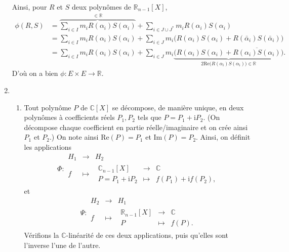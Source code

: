 \documentclass{../../td}
\begin{document}
\begin{enumerate}
      Ainsi, pour $R$ et $S$ deux polynômes de $\mathds{R}_{n-1}[X]$,
      \begin{align*}
        \phi(R, S) &= \overbrace{\sum_{i \in I} m_i R(\alpha_i) S(\alpha_i)}^{\in \mathds{R}} + \sum_{i \in J \cup J^*} m_i R(\alpha_i) S(\alpha_i) \\
        &= \sum_{i \in I} m_i R(\alpha_i) S(\alpha_i) + \sum_{i \in J} m_i\big(R(\alpha_i) S(\alpha_i) + R(\bar{\alpha}_i) S(\bar{\alpha}_i)\big) \\
        &= \sum_{i \in I} m_i R(\alpha_i) S(\alpha_i) + \sum_{i \in J} m_i\underbrace{\big(R(\alpha_i) S(\alpha_i) + \overline{R(\alpha_i)S(\alpha_i)}\big)}_{2 \mathrm{Re}\big(R(\alpha_i)S(\alpha_i)\big) \in \mathds{R}}
      .\end{align*}
      D'où on a bien $\phi : E \times E \to \mathds{R}$.
    \item
      \begin{enumerate}
        \item Tout polynôme $P$ de $\mathds{C}[X]$ se décompose, de manière unique, en deux polynômes à coefficients réels $P_1, P_2$ tels que $P = P_1 + \mathrm{i} P_2$.
          (On décompose chaque coefficient en partie réelle/imaginaire et on crée ainsi $P_1$ et $P_2$.)
          On note ainsi $\mathrm{Re}(P) = P_1$ et $\mathrm{Im}(P) = P_2$.
          Ainsi, on définit les applications
          \[
          \Phi :\begin{array}{|rcl}
            H_1 & \longrightarrow& H_2\\
            f & \longmapsto &
            \begin{array}{|rcl}
              \mathds{C}_{n-1}[X] & \to & \mathds{C}\\
              P = P_1 + \mathrm{i} P_2 & \mapsto & f(P_1) + \mathrm{i} f(P_2),
            \end{array}
          \end{array}
          \] 
          et \[
          \Psi : \begin{array}{|rcl}
            H_2 & \longrightarrow& H_1\\
            f & \longmapsto &
            \begin{array}{|rcl}
              \mathds{R}_{n-1}[X] & \to & \mathds{C}\\
              P & \mapsto & f(P).
            \end{array}
          \end{array}
          \] 
          Vérifions la $\mathds{C}$-linéarité de ces deux applications, puis qu'elles sont l'inverse l'une de l'autre.

\end{enumerate}
\end{enumerate}
\end{document}
